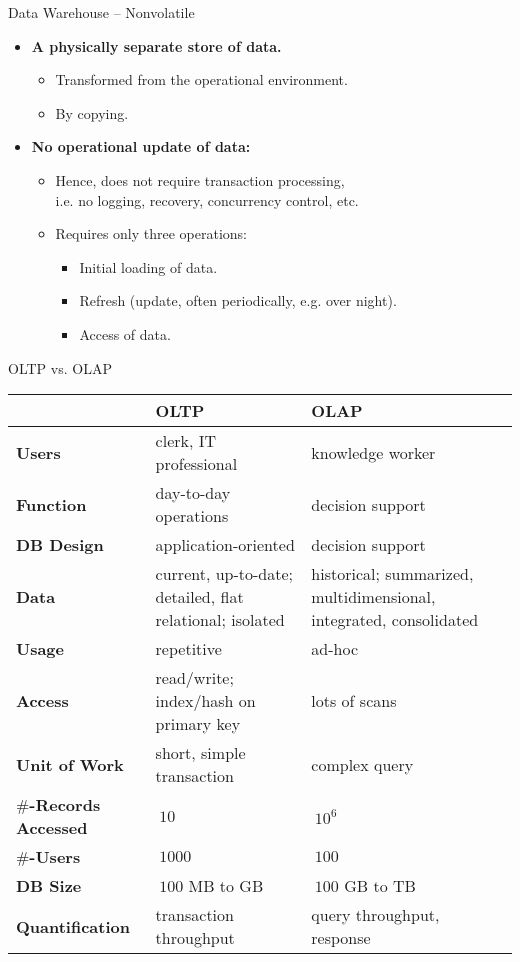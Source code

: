 \begin{frame}{Data Warehouse -- Nonvolatile}
  \begin{itemize}
  \item \textbf{A {\color{airforceblue}physically separate} store of data.}
    \begin{itemize}
    \item Transformed from the operational environment.
    \item By {\color{airforceblue}copying}.
    \end{itemize}
  \item \textbf{No operational update of data:}
    \begin{itemize}
    \item Hence, does not require transaction processing, \\
      i.e. no logging, recovery, concurrency control, etc.
    \item Requires only three operations:
      \begin{itemize}
      \item Initial loading of data.
      \item Refresh (update, often periodically, e.g. over night).
      \item Access of data.
      \end{itemize}
    \end{itemize}
  \end{itemize}
\end{frame}

\begin{frame}{OLTP vs. OLAP}
  \begin{tabularx}{\textwidth}{|l|X|X|}
    & \textbf{OLTP} & \textbf{OLAP} \\\hline
    \textbf{Users} & clerk, IT professional & knowledge worker \\
    \textbf{Function} & day-to-day operations & decision support \\
    \textbf{DB Design} & application-oriented & decision support \\
    \textbf{Data} & current, up-to-date; detailed, flat relational; isolated & historical; summarized, multidimensional, integrated, consolidated \\
    \textbf{Usage} & repetitive & ad-hoc \\
    \textbf{Access} & read/write; index/hash on primary key & lots of scans \\
    \textbf{Unit of Work} & short, simple transaction & complex query \\
    \textbf{$\#$-Records Accessed} & $~ 10$ & $~ 10^6$ \\
    \textbf{$\#$-Users} & $~ 1000$ & $~ 100$ \\
    \textbf{DB Size} & $~ 100$ MB to GB & $~ 100$ GB to TB \\
    \textbf{Quantification} & transaction throughput & query throughput, response \\
  \end{tabularx}
\end{frame}

